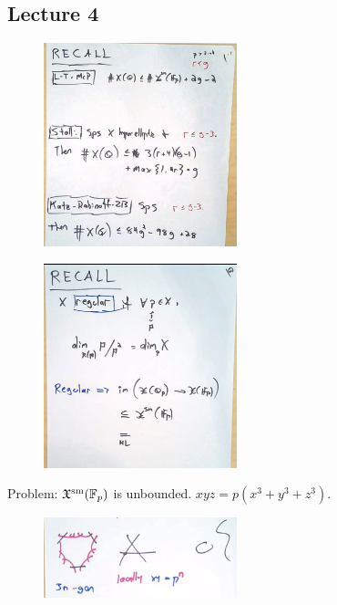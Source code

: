 \newpage
\subsection{Lecture 4}

	\begin{figure}[!ht]
	\centering
	\includegraphics[width=0.5\textwidth]{../images/im34.png}
	\end{figure}

	\begin{figure}[!ht]
	\centering
	\includegraphics[width=0.5\textwidth]{../images/im35.png}
	\end{figure}

Problem: $\mathfrak{X}^{\text{sm}}(\mathbb{F}_p)$ is unbounded. $xyz= p(x^3+y^3+z^3)$. 

	\begin{figure}[!ht]
	\centering
	\includegraphics[width=0.5\textwidth]{../images/im36.png}
	\end{figure}

